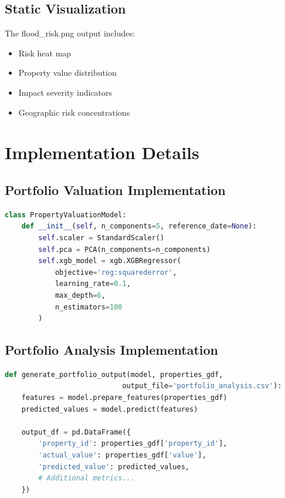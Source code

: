 \documentclass{article}
\begin{document}
\subsection{Static Visualization}
The flood\_risk.png output includes:

\begin{itemize}
    \item Risk heat map
    \item Property value distribution
    \item Impact severity indicators
    \item Geographic risk concentrations
\end{itemize}

\section{Implementation Details}

\subsection{Portfolio Valuation Implementation}
\begin{lstlisting}[language=Python]
class PropertyValuationModel:
    def __init__(self, n_components=5, reference_date=None):
        self.scaler = StandardScaler()
        self.pca = PCA(n_components=n_components)
        self.xgb_model = xgb.XGBRegressor(
            objective='reg:squarederror',
            learning_rate=0.1,
            max_depth=6,
            n_estimators=100
        )
\end{lstlisting}

\subsection{Portfolio Analysis Implementation}
\begin{lstlisting}[language=Python]
def generate_portfolio_output(model, properties_gdf, 
                            output_file='portfolio_analysis.csv'):
    features = model.prepare_features(properties_gdf)
    predicted_values = model.predict(features)
    
    output_df = pd.DataFrame({
        'property_id': properties_gdf['property_id'],
        'actual_value': properties_gdf['value'],
        'predicted_value': predicted_values,
        # Additional metrics...
    })
\end{lstlisting}
\end{document}
